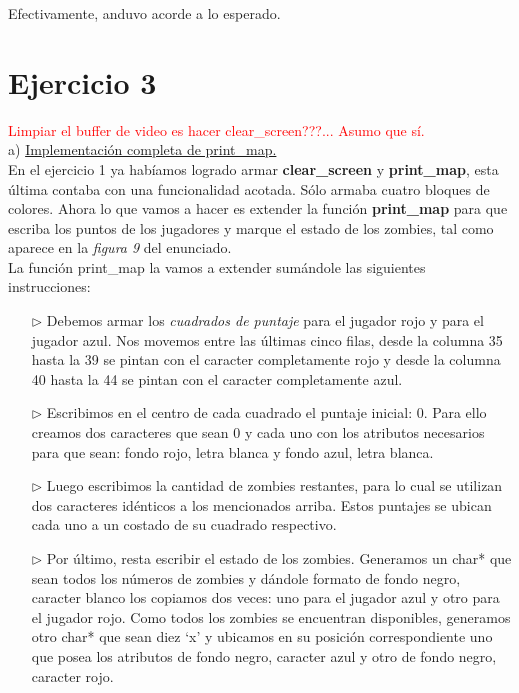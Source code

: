 \documentclass[a4paper]{article}
\begin{document}
Efectivamente, anduvo acorde a lo esperado.
\newpage
\section{Ejercicio 3}
\textcolor{red}{Limpiar el buffer de video es hacer clear_screen???... Asumo que s\'i.}\\


{\large a)} \underline{Implementaci\'on completa de print_map.} \\

En el ejercicio 1 ya hab\'iamos logrado armar \textbf{clear_screen} y \textbf{print_map}, esta \'ultima contaba con una funcionalidad acotada. S\'olo armaba cuatro bloques de colores. Ahora lo que vamos a hacer es extender la funci\'on \textbf{print_map} para que escriba los puntos de los jugadores y marque el estado de los zombies, tal como aparece en la \textit{figura 9} del enunciado.\\


La funci\'on print_map la vamos a extender sum\'andole las siguientes instrucciones:

\begin{itemize}
\item[$\triangleright$] Debemos armar los \emph{cuadrados de puntaje} para el jugador rojo y para el jugador azul. Nos movemos entre las \'ultimas cinco filas, desde la columna 35 hasta la 39 se pintan con el caracter completamente rojo y desde la columna 40 hasta la 44 se pintan con el caracter completamente azul.
\item[$\triangleright$] Escribimos en el centro de cada cuadrado el puntaje inicial: 0. Para ello creamos dos caracteres que sean 0 y cada uno con los atributos necesarios para que sean: fondo rojo, letra blanca y fondo azul, letra blanca.
\item[$\triangleright$] Luego escribimos la cantidad de zombies restantes, para lo cual se utilizan dos caracteres id\'enticos a los mencionados arriba. Estos puntajes se ubican cada uno a un costado de su cuadrado respectivo.
\item[$\triangleright$] Por \'ultimo, resta escribir el estado de los zombies. Generamos un char* que sean todos los n\'umeros de zombies y d\'andole formato de fondo negro, caracter blanco los copiamos dos veces: uno para el jugador azul y otro para el jugador rojo. Como todos los zombies se encuentran disponibles, generamos otro char* que sean diez `x' y ubicamos en su posici\'on correspondiente uno que posea los atributos de fondo negro, caracter azul y otro de fondo negro, caracter rojo.
\end{itemize}
\end{document}
